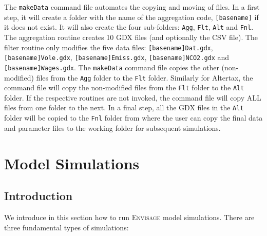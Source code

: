 The \texttt{makeData} command file automates the copying and moving of files.
In a first step, it will create a folder with the name of the aggregation code,
\texttt{[basename]} if it does not exist. It will also create the four
sub-folders: \texttt{Agg}, \texttt{Flt}, \texttt{Alt} and \texttt{Fnl}. The
aggregation routine creates 10 GDX files (and optionally the CSV file). The
filter routine only modifies the five data files: \texttt{[basename]Dat.gdx},
\texttt{[basename]Vole.gdx}, \texttt{[basename]Emiss.gdx},
\texttt{[basename]NCO2.gdx} and \texttt{[basename]Wages.gdx}. The
\texttt{makeData} command file copies the other (non-modified) files from the
\texttt{Agg} folder to the \texttt{Flt} folder. Similarly for Altertax, the
command file will copy the non-modified files from the \texttt{Flt} folder to
the \texttt{Alt} folder. If the respective routines are not invoked, the command
file will copy ALL files from one folder to the next. In a final step, all the
GDX files in the \texttt{Alt} folder will be copied to the \texttt{Fnl} folder
from where the user can copy the final data and parameter files to the working
folder for subsequent simulations.

\section{Model Simulations}

\subsection{Introduction}

We introduce in this section how to run \textsc{Envisage} model simulations.
There are three fundamental types of simulations:

